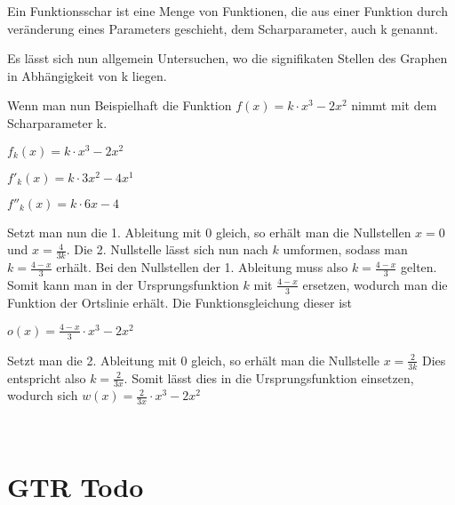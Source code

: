 Ein Funktionsschar ist eine Menge von Funktionen, die aus einer Funktion durch veränderung
eines Parameters geschieht, dem Scharparameter, auch k genannt.

Es lässt sich nun allgemein Untersuchen, wo die signifikaten Stellen des Graphen in Abhängigkeit
von k liegen.

Wenn man nun Beispielhaft die Funktion $f(x) = k \cdot x^3 - 2x^2$ nimmt mit dem Scharparameter k.

$f_{k}(x) = k \cdot x^3 - 2x^2$

$f'_{k}(x) = k \cdot 3x^2 - 4x^1$

$f''_{k}(x) = k \cdot 6x - 4$

Setzt man nun die 1. Ableitung mit 0 gleich, so erhält man die Nullstellen $x = 0$ und $x = \frac{4}{3k}$.
Die 2. Nullstelle lässt sich nun nach $k$ umformen, sodass man $k = \frac{4 - x}{3}$ erhält.
Bei den Nullstellen der 1. Ableitung muss also $k = \frac{4-x}{3}$ gelten.
Somit kann man in der Ursprungsfunktion $k$ mit $\frac{4-x}{3}$ ersetzen, wodurch man die Funktion
der Ortslinie erhält. Die Funktionsgleichung dieser ist \newline

$o(x) = \frac{4-x}{3} \cdot x^3 - 2x^2$ \newline

Setzt man die 2. Ableitung mit 0 gleich, so erhält man die Nullstelle $x = \frac{2}{3k}$
Dies entspricht also $k = \frac{2}{3x}$. Somit lässt dies in die Ursprungsfunktion einsetzen,
wodurch sich $w(x) = \frac{2}{3x} \cdot x^3 - 2x^2$

\

\section{GTR Todo}
